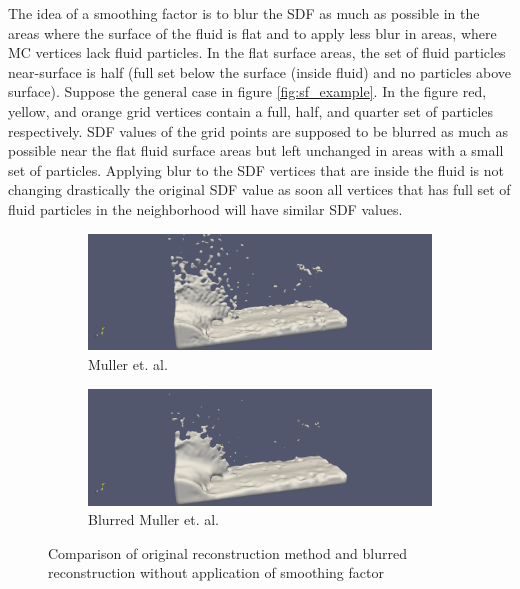 The idea of a smoothing factor is to blur the SDF as much as possible in the areas where the surface of the fluid is flat and to apply less blur in areas, where MC vertices lack fluid particles. In the flat surface areas, the set of fluid particles near-surface is half (full set below the surface (inside fluid) and no particles above surface). Suppose the general case in figure \ref{fig:sf_example}. In the figure red, yellow, and orange grid vertices contain a full, half, and quarter set of particles respectively. SDF values of the grid points are supposed to be blurred as much as possible near the flat fluid surface areas but left unchanged in areas with a small set of particles.
Applying blur to the SDF vertices that are inside the fluid is not changing drastically the original SDF value as soon all vertices that has full set of fluid particles in the neighborhood will have similar SDF values.\\
\begin{figure}[H]
	\begin{center}
		\begin{subfigure}[b]{\textwidth}
			\includegraphics[width=\textwidth]{figures/DenvityBlurredSplashArea.png}
			\caption{Muller et. al.}
			\label{fig:denc_rec}
		\end{subfigure}
		\begin{subfigure}[b]{\textwidth}
			\includegraphics[width=\textwidth]{figures/DenvityBasedSplashArea.png}
			\caption{Blurred Muller et. al.}
			\label{fig:blur_w_o_sf}
		\end{subfigure}
	\end{center}
	\caption{Comparison of original reconstruction method and blurred reconstruction without application of smoothing factor}
	\label{fig:blur_thin_area}
\end{figure}
